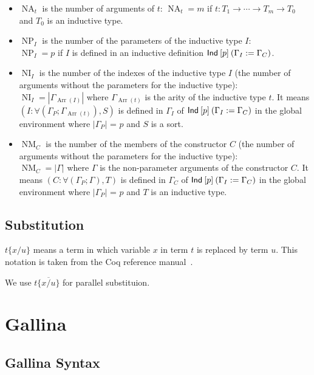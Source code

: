 \documentclass[a4paper,fleqn]{article}
\def\gallina{\textrm{Gallina}}
\DeclareMathOperator{\NA}{NA} %
\DeclareMathOperator{\NP}{NP} %
\DeclareMathOperator{\NI}{NI} %
\DeclareMathOperator{\NM}{NM} %
\DeclareMathOperator{\Arr}{Arr} %
\newcommand{\arr}[1]{\Gamma_{\Arr(#1)}}
\newcommand{\subst}[3]{#1\{#2/#3\}}
\newcommand{\substm}[3]{#1\{\overline{#2/#3}\}}
\begin{document}
\begin{itemize}
  \item $\NA_t$ is the number of arguments of $t$: \quad $\NA_t=m$ if $t : T_1 \rightarrow \dotsb \rightarrow T_m \rightarrow T_0$ and $T_0$ is an inductive type.
  \item $\NP_I$ is the number of the parameters of the inductive type $I$: \\
    $\NP_I=p$ if $I$ is defined in an inductive definition $\text{\sf Ind}\:[p]\:(\Gamma_I := \Gamma_C)$.
  \item $\NI_I$ is the number of the indexes of the inductive type $I$ (the number of arguments without the parameters for the inductive type): \\
    $\NI_I=|\arr{I}|$ where
    $\arr{t}$ is the arity of the inductive type $t$.
    It means $(I : \forall (\Gamma_P; \arr{t}), S)$ is defined in $\Gamma_I$ of $\text{\sf Ind}\:[p]\:(\Gamma_I := \Gamma_C)$ in the global environment where
    $|\Gamma_P|$ = $p$ and $S$ is a sort.
  \item $\NM_C$ is the number of the members of the constructor $C$ (the number of arguments without the parameters for the inductive type): \\
    $\NM_C=|\Gamma|$ where
    $\Gamma$ is the non-parameter arguments of the constructor $C$.
    It means $(C : \forall (\Gamma_P; \Gamma), T)$ is defined in $\Gamma_C$ of $\text{\sf Ind}\:[p]\:(\Gamma_I := \Gamma_C)$ in the global environment where
    $|\Gamma_P|$ = $p$ and $T$ is an inductive type.
\end{itemize}

\subsection{Substitution}
$\subst{t}{x}{u}$ means a term in which variable $x$ in term $t$ is replaced by term $u$.
This notation is taken from the Coq reference manual~\cite{coqrefman8.12.0}.

We use $\substm{t}{x}{u}$ for parallel substituion.

\section{\gallina{}}\label{sec:gallina}
\subsection{\gallina{} Syntax}\label{sec:gallina-syntax}
\end{document}
